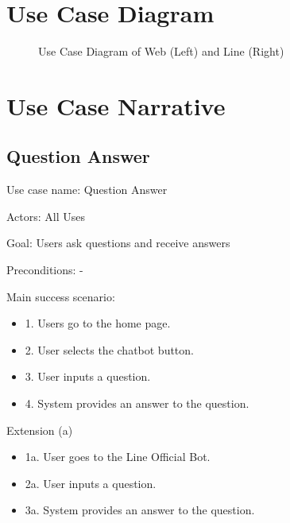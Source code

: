 \documentclass[12pt,oneside,openright,a4paper]{cpe-english-project}
\begin{document}
  \section{Use Case Diagram}
  \begin{figure}[!h]
    \centering
    \caption{Use Case Diagram of Web (Left) and Line (Right)}\label{fig:Use_Case}
  \end{figure}

  \section{Use Case Narrative}
    \subsection{Question Answer}
      \qquad Use case name: Question Answer \par
      \qquad Actors: All Uses \par
      \qquad Goal: Users ask questions and receive answers \par
      \qquad Preconditions: - \par
      \qquad Main success scenario:
      \begin{itemize}
        \item[] 1. Users go to the home page.
        \item[] 2. User selects the chatbot button.
        \item[] 3. User inputs a question.
        \item[] 4. System provides an answer to the question.
      \end{itemize}
      \qquad Extension (a)
      \begin{itemize}
        \item[] 1a. User goes to the Line Official Bot.
        \item[] 2a. User inputs a question.
        \item[] 3a. System provides an answer to the question.
      \end{itemize}
\end{document}
